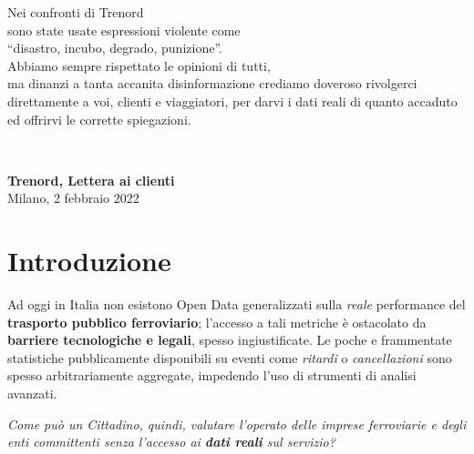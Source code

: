 \documentclass[12pt,italian]{report}
\begin{document}
\frontespizio \beforepreface

\hfill
\begin{minipage}{15cm}
	\hfill
	\begin{minipage}[t]{11cm}
		\raggedleft \large { \sl

			Nei confronti di Trenord \\
			sono state usate espressioni violente come \\
			``disastro, incubo, degrado, punizione''. \\
			\bigskip
			Abbiamo sempre rispettato le opinioni di tutti,\\
			ma dinanzi a tanta accanita disinformazione crediamo
            doveroso rivolgerci direttamente a voi, clienti e
            viaggiatori, per darvi i dati reali di quanto accaduto ed
            offrirvi le corrette spiegazioni.

			\bigskip }
	\end{minipage} \\
	\raggedleft \large

	\textbf{Trenord, Lettera ai clienti} \\
	Milano, 2 febbraio 2022
\end{minipage}
	
	
\afterpreface
	
\listoftodos
	
\chapter{Introduzione}

Ad oggi in Italia non esistono Open Data generalizzati sulla
\textit{reale} performance del \textbf{trasporto pubblico
    ferroviario}; l'accesso a tali metriche è ostacolato da
\textbf{barriere tecnologiche e legali}, spesso ingiustificate.  Le
poche e frammentate statistiche pubblicamente disponibili su eventi
come \textit{ritardi} o \textit{cancellazioni} sono spesso
arbitrariamente aggregate, impedendo l'uso di strumenti di analisi
avanzati.

\textit{Come può un Cittadino, quindi, valutare l'operato delle
    imprese ferroviarie e degli enti committenti senza l'accesso ai
    \textbf{dati reali} sul servizio?}
\end{document}
